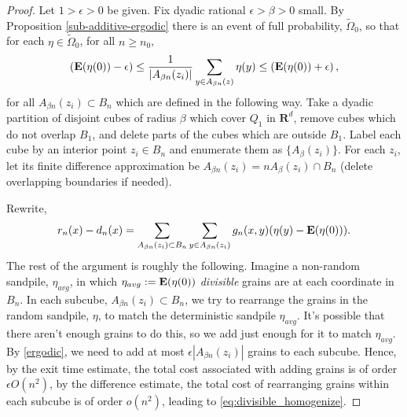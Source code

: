 \documentclass[12pt]{amsart}
\newcommand{\R}{\mathbf{R}}
\newcommand{\E}{\mathop{\bf E{}}}
\begin{document}

\begin{proof} 
	 Let $1 > \epsilon > 0$ be given.  Fix dyadic rational $\epsilon > \beta > 0$ small. By Proposition \ref{sub-additive-ergodic} there is an event of full probability, $\tilde{\Omega}_0$, so that for each $\eta \in \tilde{\Omega}_0$, for all $n \geq n_0$, 
\begin{equation}\label{ergodic}
\left( \E(\eta(0)) - \epsilon \right) \leq \frac{1}{|A_{\beta n}(z_i)|} \sum_{y \in A_{\beta n}(z)} \eta(y) \leq \left(  \E(\eta(0)) + \epsilon \right), 
\end{equation} 
 for all $A_{\beta n}(z_i) \subset B_{n}$ which are defined in the following way. 
Take a dyadic partition of disjoint cubes of radius $\beta$ which cover
$Q_1$ in $\R^d$, remove cubes which do not overlap $B_1$, and delete parts of the cubes which are outside $B_1$. Label each cube by an interior point $z_i \in B_n$ and enumerate them as $\{A_{\beta}(z_i)\}$. For each $z_i$, let its finite difference approximation be $A_{\beta n}(z_i) = n A_{\beta}(z_i) \cap B_n$ (delete overlapping boundaries if needed). 



Rewrite, 
\begin{equation}\label{eq1}
r_n(x) - d_n(x) = \sum_{A_{\beta n}(z_i) \subset B_{n}} \sum_{y \in A_{\beta n}(z_i)} g_{n}(x,y) (\eta(y) - \E(\eta(0))).
\end{equation}
The rest of the argument is roughly the following. Imagine a non-random sandpile, $\eta_{avg}$,
in which $\eta_{avg} := \E(\eta(0))$ {\it divisible} grains are at each coordinate in $B_n$. In each subcube, $A_{\beta n}(z_i) \subset B_n$, we try to rearrange the grains in the random sandpile, $\eta$, to 
match the deterministic sandpile $\eta_{avg}$. It's possible that there aren't enough grains to do this, so we add just enough for it to match $\eta_{avg}$.  By \eqref{ergodic}, we need to add at most $\epsilon |A_{\beta n}(z_i)|$ grains to each subcube.
Hence, by the exit time estimate, the total cost associated with adding grains is of order $\epsilon O(n^2)$, by the difference estimate, the total cost of rearranging grains within each subcube is of order $o(n^2)$, leading to \eqref{eq:divisible_homogenize}. 
 

\end{proof}
\end{document}
